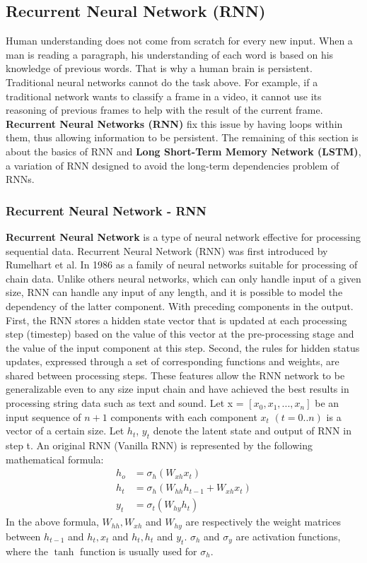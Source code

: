 \subsection{Recurrent Neural Network (RNN)}
Human understanding does not come from scratch for every new input. When a man is reading a paragraph, his understanding of each word is based on his knowledge of previous words. That is why a human brain is persistent.\\
Traditional neural networks cannot do the task above. For example, if a traditional network wants to classify a frame in a video, it cannot use its reasoning of previous frames to help with the result of the current frame.\\
\textbf{Recurrent Neural Networks (RNN)} fix this issue by having loops within them, thus allowing information to be persistent. The remaining of this section is about the basics of RNN and \textbf{Long Short-Term Memory Network (LSTM)}, a variation of RNN designed to avoid the long-term dependencies problem of RNNs.


\subsubsection{Recurrent Neural Network - RNN}
\textbf{Recurrent Neural Network} is a type of neural network effective for processing sequential data. Recurrent Neural Network (RNN) was first introduced by Rumelhart et al. In 1986 \cite{Rumelhart:1986:PDP:104279} as a family of neural networks suitable for processing of chain data. Unlike others neural networks, which can only handle input of a given size, RNN can handle any input of any length, and it is possible to model the dependency of the latter component. With preceding components in the output. First, the RNN stores a hidden state vector that is updated at each processing step (timestep) based on the value of this vector at the pre-processing stage and the value of the input component at this step. Second, the rules for hidden status updates, expressed through a set of corresponding functions and weights, are shared between processing steps. These features allow the RNN network to be generalizable even to any size input chain and have achieved the best results in processing string data such as text and sound.
Let x = $[x_{0}, x_{1}, ..., x_{n}]$ be an input sequence of $n + 1$ components with each component $x_{t}$ $(t = 0..n)$ is a vector of a certain size. Let $h_{t}$, $y_{t}$ denote the latent state and output of RNN in step t. An original RNN (Vanilla RNN) is represented by the following mathematical formula:
\begin{align}
h_{o} &= \sigma_{h}(W_{xh}x_{t})\\
h_{t} &= \sigma_{h}(W_{hh}h_{t-1} + W_{xh}x_{t})\\
y_{t} &= \sigma_{t}(W_{hy}h_{t})
\end{align}
In the above formula, $W_{hh}, W_{xh}$ and $W_{hy}$ are respectively the weight matrices between $h_{t-1}$ and $h_{t}, x_{t}$ and $h_{t}, h_{t}$ and $y_{t}$. $\sigma_{h}$ and $\sigma_{y}$ are activation functions, where the $\tanh$ function is usually used for $\sigma_{h}$.
